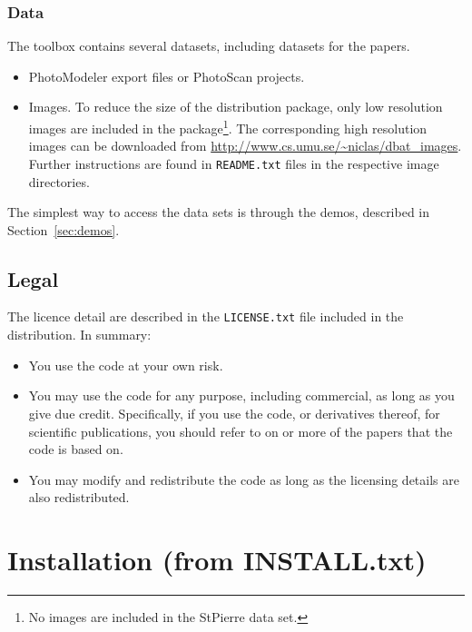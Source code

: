 \documentclass{article}
\begin{document}
\subsubsection{Data}

The toolbox contains several datasets, including datasets for the
\citet{Borlin2016:External,Murtiyoso2017:Reprocessing} papers.
\begin{itemize}
\item PhotoModeler export files or PhotoScan projects.
\item Images. To reduce the size of the distribution package, only low
  resolution images are included in the package\footnote{No images are
    included in the StPierre data set.}. The corresponding high
  resolution images can be downloaded from
  \url{http://www.cs.umu.se/~niclas/dbat_images}. Further instructions
  are found in \texttt{README.txt} files in the respective image
  directories.
\end{itemize}
The simplest way to access the data sets is through the demos,
described in Section~\ref{sec:demos}.

\subsection{Legal}

The licence detail are described in the \texttt{LICENSE.txt} file
included in the distribution. In summary:
\begin{itemize}
\item You use the code at your own risk.
\item You may use the code for any purpose, including commercial, as
  long as you give due credit. Specifically, if you use the code, or
  derivatives thereof, for scientific publications, you should refer
  to on or more of the papers
  \citet{Borlin2013:Bundle,Borlin2013:Experiments,Borlin2014:Camera,Borlin2016:External,Borlin2018:Modular}
  that the code is based on.
\item You may modify and redistribute the code as long as the
  licensing details are also redistributed.
\end{itemize}

\section[Installation]{Installation (from INSTALL.txt)}
\label{sec:install}
\label{step:dbatInit}

{\footnotesize

}
\end{document}
